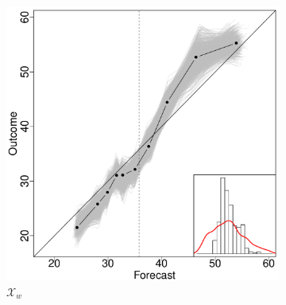 \documentclass[11pt]{article}
\theoremstyle{definition}
\theoremstyle{definition}
\begin{document}
\begin{figure}
\begin{subfigure}[b]{0.323\textwidth}
                \includegraphics[width=\textwidth]{DependentOLP}
                \caption{$\mathcal{X}_w$}
                \label{fig:gull}
        \end{subfigure}%
        \begin{subfigure}[b]{0.323\textwidth}

\end{subfigure}
\end{figure}
\end{document}
